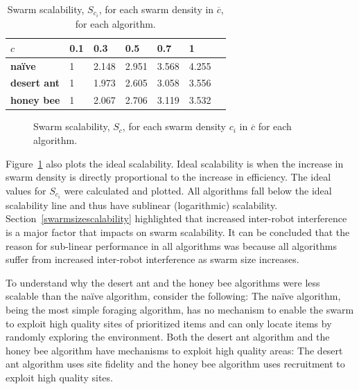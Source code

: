 \documentclass[preprint,12pt]{elsarticle}
\begin{document}
\begin{table}[!htbp]
\centering
\caption{Swarm scalability, $S_{c_i}$, for each swarm density in $\overline{c}$, for each algorithm.}
\label{table:swarmscalability}
\begin{tabular}{@{}lllllll@{}}
\toprule
\textbf{$c$}            & \textbf{0.1} & \textbf{0.3}         & \textbf{0.5}         & \textbf{0.7}         & \textbf{1}           \\ \midrule
\textbf{na\"ive}    & 1   & 2.148 & 2.951  & 3.568 & 4.255  \\
\textbf{desert ant} & 1   & 1.973 & 2.605 & 3.058  & 3.556 \\
\textbf{honey bee}  & 1   & 2.067 & 2.706 & 3.119 & 3.532 \\ \bottomrule
\end{tabular}
\end{table}

\begin{figure}[htb]
\centering
\small
\resizebox{\textwidth}{!}{}
\caption{Swarm scalability, $S_c$, for each swarm density $c_i$ in $\overline{c}$ for each algorithm.}
\label{fig:swarmscalability}
\end{figure}

Figure~\ref{fig:swarmscalability} also plots the ideal scalability. Ideal scalability is when the increase in swarm density is directly proportional to the increase in efficiency. The ideal values for $S_{c_i}$ were calculated and plotted. All algorithms fall below the ideal scalability line and thus have sublinear (logarithmic) scalability. Section~\ref{swarmsizescalability} highlighted that increased inter-robot interference is a major factor that impacts on swarm scalability. It can be concluded that the reason for sub-linear performance in all algorithms was because all algorithms suffer from increased inter-robot interference as swarm size increases.

To understand why the desert ant and the honey bee algorithms were less scalable than the na\"ive algorithm, consider the following: The na\"ive algorithm, being the most simple foraging algorithm, has no mechanism to enable the swarm to exploit high quality sites of prioritized items and can only locate items by randomly exploring the environment. Both the desert ant algorithm and the honey bee algorithm have mechanisms to exploit high quality areas: The desert ant algorithm uses site fidelity and the honey bee algorithm uses recruitment to exploit high quality sites. 
\end{document}

